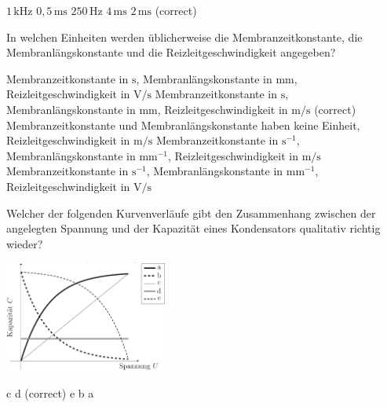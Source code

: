 \documentclass[11pt]{exam}
\begin{document}
\begin{questions}
\begin{choices}
	\choice \(\mathrm{1\,kHz}\)
	\choice \(\mathrm{0,5\,ms}\)
	\choice \(\mathrm{250\,Hz}\)
	\choice \(\mathrm{4\,ms}\)
	\choice \(\mathrm{2\,ms}\) (correct)
\end{choices}

\vspace{3mm}\question In welchen Einheiten werden üblicherweise die Membranzeitkonstante, die Membranlängskonstante und die Reizleitgeschwindigkeit angegeben?

\begin{choices}
	\choice Membranzeitkonstante in \(\mathrm{s}\), Membranlängskonstante in \(\mathrm{mm}\), Reizleitgeschwindigkeit in \(\mathrm{V/s}\)
	\choice Membranzeitkonstante in \(\mathrm{s}\), Membranlängskonstante in \(\mathrm{mm}\), Reizleitgeschwindigkeit in \(\mathrm{m/s}\) (correct)
	\choice Membranzeitkonstante und Membranlängskonstante haben keine Einheit, Reizleitgeschwindigkeit in \(\mathrm{m/s}\)
	\choice Membranzeitkonstante in \(\mathrm{s^{-1}}\), Membranlängskonstante in \(\mathrm{mm^{-1}}\), Reizleitgeschwindigkeit in \(\mathrm{m/s}\)
	\choice Membranzeitkonstante in \(\mathrm{s^{-1}}\), Membranlängskonstante in \(\mathrm{mm^{-1}}\), Reizleitgeschwindigkeit in \(\mathrm{V/s}\)
\end{choices}

\vspace{3mm}\question Welcher der folgenden Kurvenverläufe gibt den Zusammenhang zwischen der angelegten Spannung und der Kapazität eines Kondensators qualitativ richtig wieder? 

\includegraphics[width=0.4\textwidth]{images/Kondensator-C-U.png}

\begin{choices}
	\choice c
	\choice d (correct)
	\choice e
	\choice b
	\choice a
\end{choices}

\vspace{3mm}\end{questions}
\end{document}
